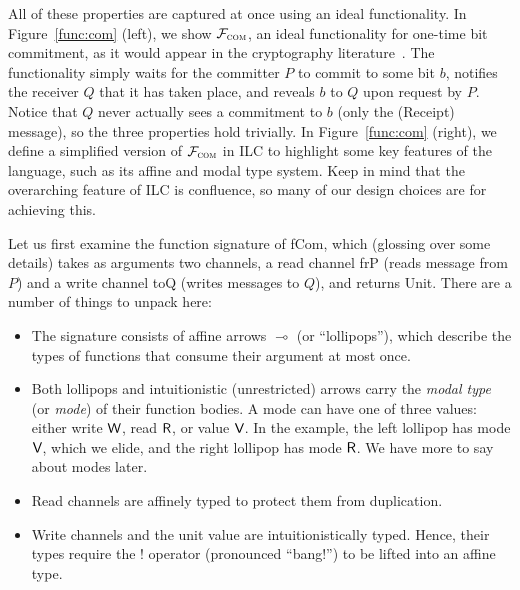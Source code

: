 %
All of these
properties are captured at once using an ideal functionality. In Figure~\ref{func:com}
(left), we show $\mathcal{{F}}_{\textsc{com}}$, an ideal functionality for one-time bit
commitment, as it would appear in the cryptography
literature~\cite{canetti2001commitments}. The functionality simply waits for the
committer $P$ to commit to some bit $b$, notifies the receiver $Q$ that it has
taken place, and reveals $b$ to $Q$ upon request by $P$. Notice that $Q$ never
actually sees a commitment to $b$ (only the (\textsf{Receipt}) message), so the
three properties hold trivially.
%
In Figure~\ref{func:com} (right), we define a simplified version of
$\mathcal{{F}}_{\textsc{com}}$ in ILC to highlight some key features of the language,
such as its affine and modal type system. Keep in mind that the overarching
feature of ILC is confluence, so many of our design choices are for achieving
this.\smallskip

Let us first examine the function signature of \textsf{fCom}, which (glossing
over some details) takes as arguments two channels, a read channel \textsf{frP}
(reads message from $P$) and a write channel \textsf{toQ} (writes messages to
$Q$), and returns \textsf{Unit}. There are a number of things to unpack here:

\begin{itemize}[leftmargin=*]
  \item The signature consists of affine arrows $\multimap$ (or ``lollipops''), which
    describe the types of functions that consume their argument at most once.
  \item Both lollipops and intuitionistic (unrestricted) arrows carry the
    \emph{modal type} (or \emph{mode}) of their function bodies. A mode can have
    one of three values: either write $\textsf{W}$, read $\textsf{R}$, or value $\textsf{V}$.  In the
    example, the left lollipop has mode $\textsf{V}$, which we elide, and the right
    lollipop has mode $\textsf{R}$. We have more to say about modes later.
  \item Read channels are affinely typed to protect them from duplication.
  \item Write channels and the unit value are intuitionistically typed. Hence,
    their types require the ! operator (pronounced ``bang!'') to be lifted into
    an affine type.
\end{itemize}

